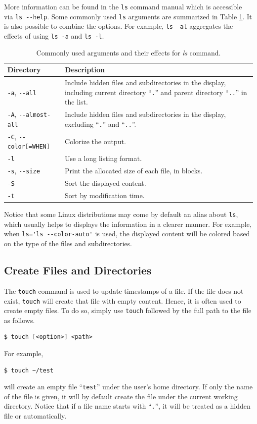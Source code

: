 More information can be found in the \verb|ls| command manual which is accessible via \verb|ls --help|. Some commonly used \verb|ls| arguments are summarized in Table \ref{ch:fm:tab:lscommandargument}. It is also possible to combine the options. For example, \verb|ls -al| aggregates the effects of using \verb|ls -a| and \verb|ls -l|.

\begin{table}[!htb]
  \centering \caption{Commonly used arguments and their effects for \textit{ls} command.}\label{ch:fm:tab:lscommandargument}
  \begin{tabularx}{\textwidth}{lX}
    \hline
    Directory & Description \\ \hline
    \verb|-a|, \verb|--all| & Include hidden files and subdirectories in the display, including current directory ``\verb|.|'' and parent directory ``\verb|..|'' in the list. \\ 
    \verb|-A|, \verb|--almost-all| & Include hidden files and subdirectories in the display, excluding ``\verb|.|'' and ``\verb|..|''. \\ 
    \verb|-C|, \verb|--color[=WHEN]| & Colorize the output. \\ 
    \verb|-l| & Use a long listing format. \\ 
    \verb|-s|, \verb|--size| & Print the allocated size of each file, in blocks. \\ 
    \verb|-S| & Sort the displayed content. \\ 
    \verb|-t| & Sort by modification time. \\
    \hline
  \end{tabularx}
\end{table}

Notice that some Linux distributions may come by default an alias about \verb|ls|, which usually helps to displays the information in a clearer manner. For example, when \verb|ls='ls --color-auto'| is used, the displayed content will be colored based on the type of the files and subdirectories.

\subsection{Create Files and Directories}

The \verb|touch| command is used to update timestamps of a file. If the file does not exist, \verb|touch| will create that file with empty content. Hence, it is often used to create empty files. To do so, simply use \verb|touch| followed by the full path to the file as follows.
\begin{lstlisting}
$ touch [<option>] <path>
\end{lstlisting}
For example,
\begin{lstlisting}
$ touch ~/test
\end{lstlisting}
will create an empty file ``\texttt{test}'' under the user's home directory. If only the name of the file is given, it will by default create the file under the current working directory. Notice that if a file name starts with ``\verb|.|'', it will be treated as a hidden file or automatically.


